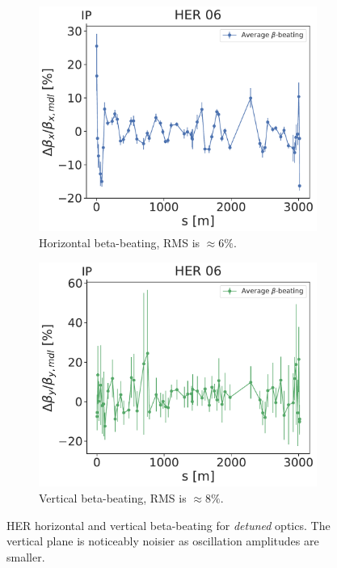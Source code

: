 \begin{figure}[!htb]
    \centering
    \begin{subfigure}[b]{0.48\textwidth}
        \includegraphics[width=\linewidth]{images/kek/her_06_bet_x.pdf}
        \caption{Horizontal beta-beating, RMS is $\approx 6\%$.}
    \end{subfigure}
    \hfill
    \begin{subfigure}[b]{0.48\textwidth}
        \includegraphics[width=\linewidth]{images/kek/her_06_bet_y.pdf}
        \caption{Vertical beta-beating, RMS is $\approx 8\%$.}
    \end{subfigure}
    \caption{HER horizontal and vertical beta-beating for \textit{detuned} optics. The vertical
    plane is noticeably noisier as oscillation amplitudes are smaller.}
    \label{fig:kek:beating_her_detuned}
\end{figure}


